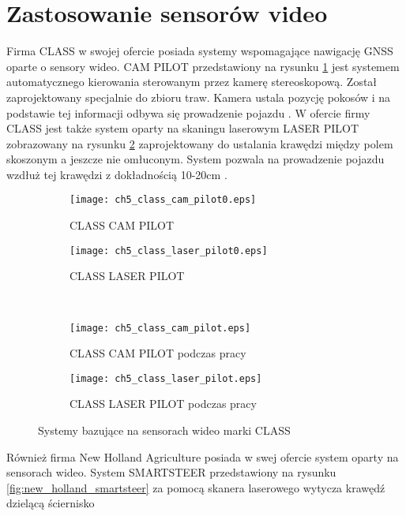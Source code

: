 \section{Zastosowanie sensorów video}
Firma CLASS w swojej ofercie posiada systemy wspomagające nawigację GNSS oparte o sensory wideo. CAM PILOT przedstawiony na rysunku \ref{fig:class_cam_pilot1}
jest systemem automatycznego kierowania sterowanym przez kamerę stereoskopową. Został zaprojektowany specjalnie do zbioru traw. Kamera ustala pozycję pokosów 
i na podstawie tej informacji odbywa się prowadzenie pojazdu \cite[][strona 7]{CLAAS_stearing_systems}.
W ofercie firmy CLASS jest także system oparty na skaningu laserowym LASER PILOT zobrazowany na 
rysunku \ref{fig:class_laser_pilot1} zaprojektowany do ustalania krawędzi między polem skoszonym a jeszcze nie omłuconym. System pozwala na 
prowadzenie pojazdu wzdłuż tej krawędzi z dokładnością 10-20cm \cite[][strona 6]{CLAAS_stearing_systems}.
\begin{figure}[H]
\centering
	\begin{subfigure}{0.4\textwidth}
		\centering
		\texttt{[image: ch5\_class\_cam\_pilot0.eps]}
		\caption{CLASS CAM PILOT}
		\label{fig:class_cam_pilot1}
	\end{subfigure}
	\begin{subfigure}{0.4\textwidth}
                \centering
                \texttt{[image: ch5\_class\_laser\_pilot0.eps]}
                \caption{CLASS LASER PILOT}
                \label{fig:class_laser_pilot1}
	\end{subfigure} \\
	\vfill
	\begin{subfigure}{0.4\textwidth}
                \centering
                \texttt{[image: ch5\_class\_cam\_pilot.eps]}
                \caption{CLASS CAM PILOT podczas pracy}
                \label{fig:class_cam_pilot2}
	\end{subfigure}
	\begin{subfigure}{0.4\textwidth}
                \centering
                \texttt{[image: ch5\_class\_laser\_pilot.eps]}
                \caption{CLASS LASER PILOT podczas pracy}
                \label{fig:class_laser_pilot2}
	\end{subfigure}
\caption{Systemy bazujące na sensorach wideo marki CLASS}
\end{figure}
\indent Również firma New Holland Agriculture posiada w swej ofercie system oparty na sensorach wideo.
System SMARTSTEER przedstawiony na rysunku \ref{fig:new_holland_smartsteer} za pomocą skanera laserowego wytycza krawędź dzielącą ściernisko 
